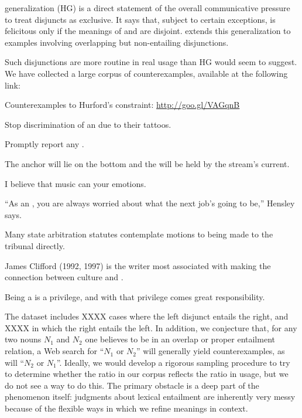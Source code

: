 \documentclass{article}
\begin{document}
 generalization (HG) is a direct statement of
the overall communicative pressure to treat disjuncts as exclusive.
It says that, subject to certain exceptions,  is
felicitous only if the meanings of  and  are disjoint.
 extends this generalization to examples
involving overlapping but non-entailing disjunctions. 

Such disjunctions are more routine in real usage than HG would seem to
suggest. We have collected a large corpus of counterexamples,
available at the following link:
%
\begin{examples}
\item\label{ourcorpus} Counterexamples to Hurford's constraint: \url{http://goo.gl/VAGqnB}
  \begin{examples}
  \item Stop discrimination of an  due to their tattoos.
  \item Promptly report any .
  \item The anchor will lie on the bottom and the  will be held by the stream's current.
  \item I believe that music can  your emotions.
  \item ``As an , you are always worried about what the next job's going to be,'' Hensley says.
  \item Many state arbitration statutes contemplate motions to  being made to the tribunal directly.
  \item James Clifford (1992, 1997) is the writer most associated with making the connection between culture and .
  \item Being a  is a privilege, and with that privilege comes great responsibility.
  \end{examples}
\end{examples}
%
The dataset includes XXXX cases where the left disjunct entails the
right, and XXXX in which the right entails the left.  In addition, we
conjecture that, for any two nouns $N_{1}$ and $N_{2}$ one believes to
be in an overlap or proper entailment relation, a Web search for
``$N_{1}$ or $N_{2}$'' will generally yield counterexamples, as will
``$N_{2}$ or $N_{1}$''. Ideally, we would develop a rigorous sampling
procedure to try to determine whether the ratio in our corpus reflects
the ratio in usage, but we do not see a way to do this. The primary
obstacle is a deep part of the phenomenon itself: judgments about
lexical entailment are inherently very messy because of the flexible
ways in which we refine meanings in context.
\end{document}
